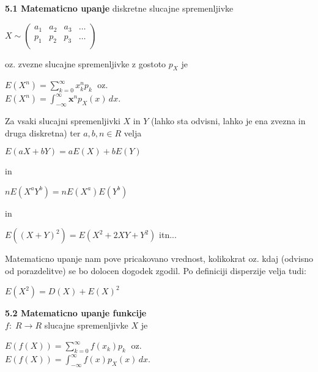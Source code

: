 \documentclass{article}
\begin{document}
\begin{multicols}{3}
\textbf{5.1 Matematicno upanje} diskretne slucajne spremenljivke
\begin{center}
    \begin{small}
        \begin{math}
            X \sim
            \begin{pmatrix}
                a_{1} & a_{2} & a_{3} & \dots \\
                p_{1} & p_{2} & p_{3} & \dots \\
            \end{pmatrix}
        \end{math}
    \end{small}
\end{center}
oz. zvezne slucajne spremenljivke z gostoto $p_X$ je
\begin{center}
    \begin{math}
        E(X^n) = \sum_{k=0}^{\infty} x_k^n p_k\;
    \end{math} oz.\\
    \begin{math}
        E(X^n) = \int_{- \infty}^{ \infty} \textbf{x}^n p_X(x)\, dx
    \end{math}.
\end{center}
Za vsaki slucajni spremenljivki $X$ in $Y$ (lahko sta odvisni, lahko je ena zvezna in druga diskretna)
ter $a, b, n \in R$ velja 
\begin{center}
    \begin{math}
        E(aX + bY) = aE(X) + bE(Y)
    \end{math}
\end{center} in
\begin{center}
    \begin{math}
        nE(X^a Y^b) = nE(X^a) E(Y^b)
    \end{math}
\end{center} in
\begin{center}
    \begin{math}
        E((X + Y)^2) = E(X^2 + 2XY + Y^2)
    \end{math} itn...
\end{center}
Matematicno upanje nam pove pricakovano vrednost, kolikokrat oz. kdaj (odvisno od porazdelitve) 
se bo dolocen dogodek zgodil. Po definiciji disperzije velja tudi:
\begin{center}
    $E(X^2) = D(X) + E(X)^2$    
\end{center}

\textbf{5.2 Matematicno upanje funkcije}\\
$f:\; R \rightarrow R$ slucajne spremenljivke $X$ je
\begin{center}
    \begin{math}
        E(f(X)) = \sum_{k=0}^{\infty} f(x_k) p_k\;
    \end{math} oz.\\
    \begin{math}
        E(f(X)) = \int_{- \infty}^{ \infty} f(x) p_X (x)\, dx
    \end{math}.
\end{center}


\end{multicols}
\end{document}
